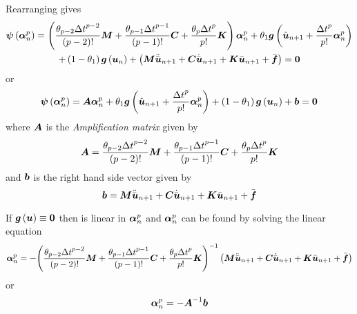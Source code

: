 Rearranging gives
\begin{multline}
  \fnof{\vectr{\psi}}{\vectr{\alpha}^{p}_{n}}=\pbrac{\dfrac{\theta_{p-2}{\Delta
        t}^{p-2}}{\factorial{p-2}}\matr{M}+\dfrac{\theta_{p-1}{\Delta
        t}^{p-1}}{\factorial{p-1}}\matr{C}+\dfrac{\theta_{p}{\Delta
        t}^{p}}{p!}\matr{K}}\vectr{\alpha}^{p}_{n}+\theta_{1}\fnof{\vectr{g}}{\hat{\vectr{u}}_{n+1}+ 
    \dfrac{{\Delta t}^{p}}{p!}\vectr{\alpha}^{p}_{n}} \\
  +\pbrac{1-\theta_{1}}\fnof{\vectr{g}}{\vectr{u}_{n}}+
  \pbrac{\matr{M}\ddot{\bar{\vectr{u}}}_{n+1}+\matr{C}\dot{\bar{\vectr{u}}}_{n+1}+\matr{K}\bar{\vectr{u}}_{n+1}+
    \bar{\vectr{f}}}= \vectr{0}
  \label{eqn:dynamic}
\end{multline}
or 
\begin{equation}
\fnof{\vectr{\psi}}{\vectr{\alpha}^{p}_{n}}=\matr{A}\vectr{\alpha}^{p}_{n}+
\theta_{1}\fnof{\vectr{g}}{\hat{\vectr{u}}_{n+1}+ \dfrac{{\Delta
      t}^{p}}{p!}\vectr{\alpha}^{p}_{n}}+\pbrac{1-\theta_{1}}\fnof{\vectr{g}}{\vectr{u}_{n}}+\vectr{b}= \vectr{0}
\end{equation}
where $\matr{A}$ is the \emph{Amplification matrix} given by
\begin{equation}
  \matr{A}=\dfrac{\theta_{p-2}{\Delta t}^{p-2}}{\factorial{p-2}}\matr{M}+
  \dfrac{\theta_{p-1}{\Delta t}^{p-1}}{\factorial{p-1}}\matr{C}+
  \dfrac{\theta_{p}{\Delta t}^{p}}{p!}\matr{K}
\end{equation}
and $\boldsymbol{b}$ is the right hand side vector given by
\begin{equation}
  \vectr{b}=\matr{M}\ddot{\bar{\vectr{u}}}_{n+1}+\matr{C}\dot{\bar{\vectr{u}}}_{n+1}+
  \matr{K}\bar{\vectr{u}}_{n+1}+\bar{\vectr{f}}
\end{equation}

If $ \boldsymbol{g}\left( \boldsymbol{u} \right) \equiv\boldsymbol{0}$ then  is linear in
$\boldsymbol{\alpha}^{p}_{n}$ and $\boldsymbol{\alpha}^{p}_{n}$ can be found by solving
the linear equation
\begin{equation}
  \vectr{\alpha}^{p}_{n} =-\inverse{\pbrac{\dfrac{\theta_{p-2}{\Delta t}^{p-2}}{\factorial{p-2}}\matr{M}+
      \dfrac{\theta_{p-1}{\Delta t}^{p-1}}{\factorial{p-1}}\matr{C}+
      \dfrac{\theta_{p}{\Delta
          t}^{p}}{p!}\matr{K}}}\pbrac{\matr{M}\ddot{\bar{\vectr{u}}}_{n+1}+
    \matr{C}\dot{\bar{\vectr{u}}}_{n+1}+\matr{K}\bar{\vectr{u}}_{n+1}+\bar{\vectr{f}}}
\end{equation}
or 
\begin{equation}
  \vectr{\alpha}^{p}_{n} =-\inverse{\matr{A}}\vectr{b}
\end{equation}


